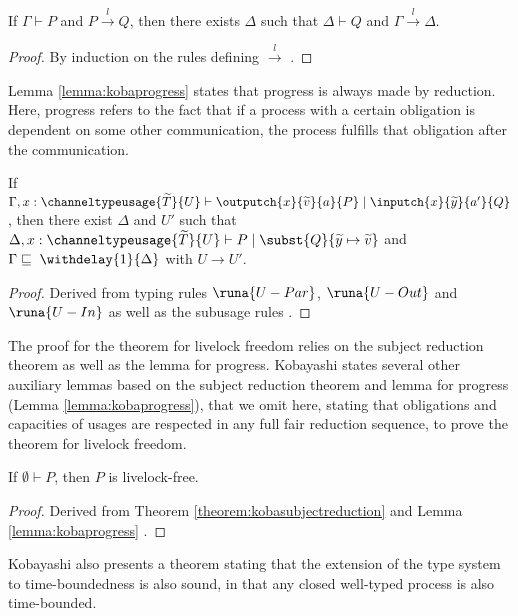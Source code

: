 \begin{theorem}
If $\Gamma \vdash P$ and $P \xrightarrow{\;l\;} Q$, then there exists $\Delta$ such that $\Delta \vdash Q$ and $\Gamma \xrightarrow{\;l\;} \Delta$.
\label{theorem:kobasubjectreduction}
\end{theorem}
\begin{proof}
By induction on the rules defining $\xrightarrow{\;l\;}$ \cite{Kobayashi2000}.
\end{proof}

Lemma \ref{lemma:kobaprogress} states that progress is always made by reduction. Here, progress refers to the fact that if a process with a certain obligation is dependent on some other communication, the process fulfills that obligation after the communication.

\begin{lemma}
If $\Gamma, x:\channeltypeusage{\widetilde{T}}{U} \vdash \outputch{x}{\widetilde{v}}{a}{P} \mid \inputch{x}{\widetilde{y}}{a'}{Q}$, then there exist $\Delta$ and $U'$ such that $\Delta, x:\channeltypeusage{\widetilde{T}}{U} \vdash P \mid \subst{Q}{\widetilde{y} \mapsto \widetilde{v}}$ and $\Gamma \sqsubseteq \;\withdelay{1}{\Delta}$ with $U \longrightarrow U'$.
\label{lemma:kobaprogress}
\end{lemma}
\begin{proof}
Derived from typing rules $\runa{U-Par}$, $\runa{U-Out}$ and $\runa{U-In}$ as well as the subusage rules \cite{Kobayashi2000}.
\end{proof}

The proof for the theorem for livelock freedom relies on the subject reduction theorem as well as the lemma for progress. Kobayashi states several other auxiliary lemmas based on the subject reduction theorem and lemma for progress (Lemma \ref{lemma:kobaprogress}), that we omit here, stating that obligations and capacities of usages are respected in any full fair reduction sequence, to prove the theorem for livelock freedom.

\begin{theorem}
If $\emptyset \vdash P$, then $P$ is livelock-free.
\end{theorem}
\begin{proof}
Derived from Theorem \ref{theorem:kobasubjectreduction} and Lemma \ref{lemma:kobaprogress} \cite{Kobayashi2000}. 
\end{proof}

Kobayashi also presents a theorem stating that the extension of the type system to time-boundedness is also sound, in that any closed well-typed process is also time-bounded.

